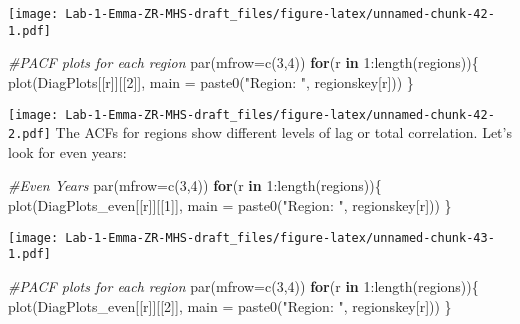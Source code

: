\documentclass[
]{article}
\newenvironment{Shaded}{\begin{snugshade}}{\end{snugshade}}
\newcommand{\AttributeTok}[1]{\textcolor[rgb]{0.77,0.63,0.00}{#1}}
\newcommand{\CommentTok}[1]{\textcolor[rgb]{0.56,0.35,0.01}{\textit{#1}}}
\newcommand{\ControlFlowTok}[1]{\textcolor[rgb]{0.13,0.29,0.53}{\textbf{#1}}}
\newcommand{\DecValTok}[1]{\textcolor[rgb]{0.00,0.00,0.81}{#1}}
\newcommand{\FunctionTok}[1]{\textcolor[rgb]{0.00,0.00,0.00}{#1}}
\newcommand{\NormalTok}[1]{#1}
\newcommand{\SpecialCharTok}[1]{\textcolor[rgb]{0.00,0.00,0.00}{#1}}
\newcommand{\StringTok}[1]{\textcolor[rgb]{0.31,0.60,0.02}{#1}}
\begin{document}
\texttt{[image: Lab-1-Emma-ZR-MHS-draft\_files/figure-latex/unnamed-chunk-42-1.pdf]}

\begin{Shaded}
\begin{Highlighting}[]
\CommentTok{\#PACF plots for each region}
\FunctionTok{par}\NormalTok{(}\AttributeTok{mfrow=}\FunctionTok{c}\NormalTok{(}\DecValTok{3}\NormalTok{,}\DecValTok{4}\NormalTok{))}
\ControlFlowTok{for}\NormalTok{(r }\ControlFlowTok{in} \DecValTok{1}\SpecialCharTok{:}\FunctionTok{length}\NormalTok{(regions))\{}
  \FunctionTok{plot}\NormalTok{(DiagPlots[[r]][[}\DecValTok{2}\NormalTok{]], }\AttributeTok{main =} \FunctionTok{paste0}\NormalTok{(}\StringTok{"Region: "}\NormalTok{, regionskey[r]))}
\NormalTok{\}}
\end{Highlighting}
\end{Shaded}

\texttt{[image: Lab-1-Emma-ZR-MHS-draft\_files/figure-latex/unnamed-chunk-42-2.pdf]}
The ACFs for regions show different levels of lag or total correlation.
Let's look for even years:

\begin{Shaded}
\begin{Highlighting}[]
\CommentTok{\#Even Years }
\FunctionTok{par}\NormalTok{(}\AttributeTok{mfrow=}\FunctionTok{c}\NormalTok{(}\DecValTok{3}\NormalTok{,}\DecValTok{4}\NormalTok{))}
\ControlFlowTok{for}\NormalTok{(r }\ControlFlowTok{in} \DecValTok{1}\SpecialCharTok{:}\FunctionTok{length}\NormalTok{(regions))\{}
  \FunctionTok{plot}\NormalTok{(DiagPlots\_even[[r]][[}\DecValTok{1}\NormalTok{]], }\AttributeTok{main =} \FunctionTok{paste0}\NormalTok{(}\StringTok{"Region: "}\NormalTok{, regionskey[r]))}
\NormalTok{\}}
\end{Highlighting}
\end{Shaded}

\texttt{[image: Lab-1-Emma-ZR-MHS-draft\_files/figure-latex/unnamed-chunk-43-1.pdf]}

\begin{Shaded}
\begin{Highlighting}[]
\CommentTok{\#PACF plots for each region}
\FunctionTok{par}\NormalTok{(}\AttributeTok{mfrow=}\FunctionTok{c}\NormalTok{(}\DecValTok{3}\NormalTok{,}\DecValTok{4}\NormalTok{))}
\ControlFlowTok{for}\NormalTok{(r }\ControlFlowTok{in} \DecValTok{1}\SpecialCharTok{:}\FunctionTok{length}\NormalTok{(regions))\{}
  \FunctionTok{plot}\NormalTok{(DiagPlots\_even[[r]][[}\DecValTok{2}\NormalTok{]], }\AttributeTok{main =} \FunctionTok{paste0}\NormalTok{(}\StringTok{"Region: "}\NormalTok{, regionskey[r]))}
\NormalTok{\}}
\end{Highlighting}
\end{Shaded}
\end{document}

